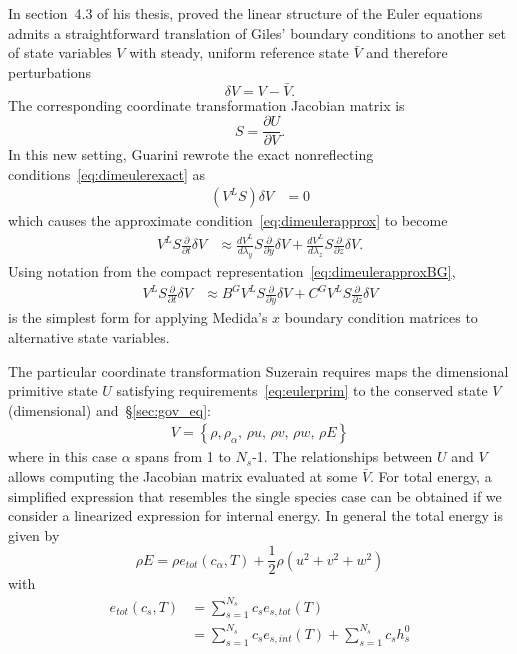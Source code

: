 In section~4.3 of his thesis, \citet{Guarini1998} proved the linear
structure of the Euler equations admits a straightforward translation of Giles'
boundary conditions to another set of state variables $V$ with steady, uniform
reference state $\bar{V}$ and therefore perturbations
\[
  \delta{}V = V - \bar{V}.
\]
The corresponding coordinate transformation Jacobian matrix is
\[
   S = \frac{\partial{}U}{\partial{}V}
   .
\]
In this new setting, Guarini rewrote the exact nonreflecting
conditions~\eqref{eq:dimeulerexact} as
\begin{align}
  \left(V^L S\right) \delta{}V &= 0
\end{align}
which causes the approximate condition~\eqref{eq:dimeulerapprox} to become
\begin{align}
\label{eq:dimeulertransform}
  V^L
  S
  \frac{\partial}{\partial{}t}
  \delta{}V
  &\approx
  \frac{dV^L}{d\lambda_y}
  S
  \frac{\partial}{\partial{}y}
  \delta{}V
  +
  \frac{dV^L}{d\lambda_z}
  S
  \frac{\partial}{\partial{}z}
  \delta{}V
  .
\end{align}
Using notation from the compact representation~\eqref{eq:dimeulerapproxBG},
\begin{align}
\label{eq:dimeulertransformcharnot}
  V^L S
  \frac{\partial}{\partial{}t}
  \delta{}V
  &\approx
  B^G V^L S
  \frac{\partial}{\partial{}y}
  \delta{}V
  +
  C^G V^L S
  \frac{\partial}{\partial{}z}
  \delta{}V
\end{align}
is the simplest form for applying Medida's $x$ boundary condition matrices to
alternative state variables.

The particular coordinate transformation Suzerain requires maps the dimensional
primitive state $U$ satisfying requirements~\eqref{eq:eulerprim} to the
conserved state $V$ (dimensional) and~\S\ref{sec:gov_eq}:
%
\begin{align}
\label{eq:multieulerconsdim}
V
= \left\{
    \rho,
    \rho_\alpha,
  \,\rho u,
  \,\rho v,
  \,\rho w,
  \,\rho E
\right\}
\end{align}
%
where in this case $\alpha$ spans from 1 to $N_s$-1.
The relationships between $U$ and $V$ allows computing the Jacobian matrix
evaluated at some $\bar{V}$.  For total energy, a simplified expression that
resembles the single species case can be obtained if we consider a linearized
expression for internal energy. In general the total energy is given by
%
\begin{equation}
\rho E = \rho e_{tot}(c_\alpha, T) + \frac{1}{2} \rho \left( u^2 + v^2+ w^2 \right)
\end{equation}
%
with 
%
\begin{equation}
\begin{split}
e_{tot}(c_s, T) 
&= \sum_{s=1}^{N_s} c_s e_{s,tot}(T)  \\
&= \sum_{s=1}^{N_s} c_s e_{s,int}(T) + \sum_{s=1}^{N_s} c_s h^0_s 
\end{split}
\end{equation}
%


